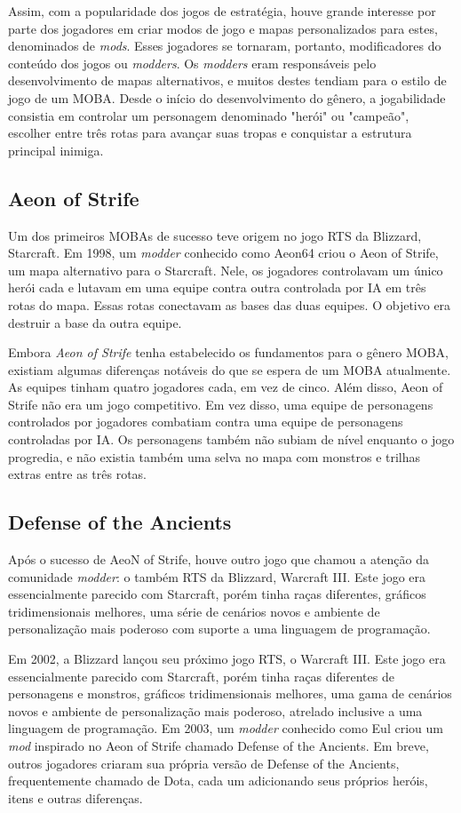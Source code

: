 Assim, com a popularidade dos jogos de estratégia, houve grande interesse por parte dos jogadores em criar modos de jogo e mapas personalizados para estes, denominados de \textit{mods}. Esses jogadores se tornaram, portanto, modificadores do conteúdo dos jogos ou \textit{modders}. Os \textit{modders} eram responsáveis pelo desenvolvimento de mapas alternativos, e muitos destes tendiam para o estilo de jogo de um MOBA. Desde o início do desenvolvimento do gênero, a jogabilidade consistia em controlar um personagem denominado "herói" ou "campeão", escolher entre três rotas para avançar suas tropas e conquistar a estrutura principal inimiga.

\subsection{Aeon of Strife}
Um dos primeiros MOBAs de sucesso teve origem no jogo RTS da Blizzard, Starcraft. Em 1998, um \textit{modder} conhecido como Aeon64 criou o Aeon of Strife, um mapa alternativo para o Starcraft. Nele, os jogadores controlavam um único herói cada e lutavam em uma equipe contra outra controlada por IA em três rotas do mapa. Essas rotas conectavam as bases das duas equipes. O objetivo era destruir a base da outra equipe.

Embora \textit{Aeon of Strife} tenha estabelecido os fundamentos para o gênero MOBA, existiam algumas diferenças notáveis do que se espera de um MOBA atualmente. As equipes tinham quatro jogadores cada, em vez de cinco. Além disso, Aeon of Strife não era um jogo competitivo. Em vez disso, uma equipe de personagens controlados por jogadores combatiam contra uma equipe de personagens controladas por IA. Os personagens também não subiam de nível enquanto o jogo progredia, e não existia também uma selva no mapa com monstros e trilhas extras entre as três rotas.

\subsection{Defense of the Ancients}
Após o sucesso de AeoN of Strife, houve outro jogo que chamou a atenção da comunidade \textit{modder}: o também RTS da Blizzard, Warcraft III. Este jogo era essencialmente parecido com Starcraft, porém tinha raças diferentes, gráficos tridimensionais melhores, uma série de cenários novos e ambiente de personalização mais poderoso com suporte a uma linguagem de programação.

Em 2002, a Blizzard lançou seu próximo jogo RTS, o Warcraft III. Este jogo era essencialmente parecido com Starcraft, porém tinha raças diferentes de personagens e monstros, gráficos tridimensionais melhores, uma gama de cenários novos e ambiente de personalização mais poderoso, atrelado inclusive a uma linguagem de programação. Em 2003, um \textit{modder} conhecido como Eul criou um \textit{mod} inspirado no Aeon of Strife chamado Defense of the Ancients. Em breve, outros jogadores criaram sua própria versão de Defense of the Ancients, frequentemente chamado de Dota, cada um adicionando seus próprios heróis, itens e outras diferenças.

